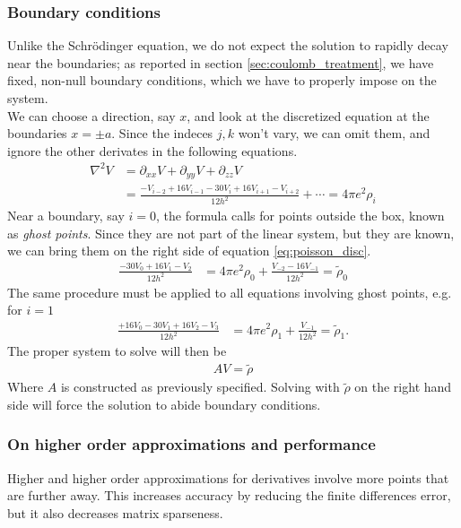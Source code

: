 \subsubsection{Boundary conditions}
Unlike the Schr\"odinger equation, we do not expect the solution to rapidly decay near the boundaries; as reported in section \ref{sec:coulomb_treatment}, we have fixed, non-null boundary conditions, which we have to properly impose on the system.
\\We can choose a direction, say $x$, and look at the discretized equation at the boundaries $x=\pm a$. Since the indeces $j,k$ won't vary, we can omit them, and ignore the other derivates in the following equations.
\begin{align}
    \label{eq:poisson_disc}
    \nabla^2 V &= \partial_{xx} V + \partial_{yy}V + \partial_{zz}V\nonumber \\
    &= \frac{-V_{i-2} + 16V_{i-1} -30V_i + 16V_{i+1} - V_{i+2}}{12h^2}+\cdots=4\pi e^2 \rho_i
\end{align}
Near a boundary, say $i = 0$, the formula calls for points outside the box, known as \textit{ghost points}. Since they are not part of the linear system, but they are known, we can bring them on the right side of equation \eqref{eq:poisson_disc}.
\begin{align}
    \frac{-30 V_0 + 16 V_1 - V_2 }{12h^2} &= 4\pi e^2 \rho_0 +\frac{ V_{-2} -16V_{-1}}{12h^2} = \tilde\rho_0
\end{align}
The same procedure must be applied to all equations involving ghost points, e.g. for $i=1$
\begin{align}
    \frac{+16V_0 -30V_{1} + 16 V_2 - V_3}{12h^2} &= 4\pi e^2 \rho_1 + \frac{V_{-1} }{12h^2} = \tilde\rho_1.
\end{align}
The proper system to solve will then be
\begin{align}
A V = \tilde \rho
\end{align}
Where $A$ is constructed as previously specified. Solving with $\tilde \rho $ on the right hand side will force the solution to abide boundary conditions.
\subsubsection{On higher order approximations and performance}
Higher and higher order approximations for derivatives involve more points that are further away. This increases accuracy by reducing the finite differences error, but it also decreases matrix sparseness.